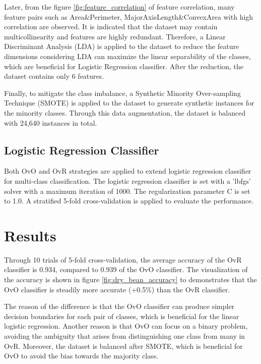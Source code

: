 \documentclass[12pt,a4paper]{article}
\begin{document}
Later, from the figure \ref{fig:feature_correlation} of feature correlation, many feature pairs such as Area&Perimeter, MajorAxisLength&ConvexArea with high correlation are observed. It is indicated that the dataset may contain multicollinearity and features are highly redundant. 
Therefore, a Linear Discriminant Analysis (LDA) is applied to the dataset to reduce the feature dimensions considering LDA can maximize the linear separability of the classes, which are beneficial for Logistic Regression classifier. After the reduction, the dataset contains only 6 features.

Finally, to mitigate the class imbalance, a Synthetic Minority Over-sampling Technique (SMOTE) \cite{chawla2002smote} is applied to the dataset to generate synthetic instances for the minority classes. 
Through this data augmentation, the dataset is balanced with 24,640 instances in total.
\subsection{Logistic Regression Classifier}\label{subsec:classifier}
Both OvO \cite{scikit-learn_OneVsRestClassifier} and OvR \cite{scikit-learn_OneVsOneClassifier} strategies are applied to extend logistic regression classifier for multi-class classification. 
The logistic regression classifier is set with a 'lbfgs' solver with a maximum iteration of 1000. The regularization parameter C is set to 1.0. 
A stratified 5-fold cross-validation \cite{scikit-learn_cross_validation} is applied to evaluate the performance.

\section{Results}\label{sec:results}
Through 10 trials of 5-fold cross-validation, the average accuracy of the OvR classifier is 0.934, compared to 0.939 of the OvO classifier. 
The visualization of the accuracy is shown in figure \ref{fig:dry_bean_accuracy} to demonstrates that the OvO classifier is steadily more accurate (+0.5\%) than the OvR classifier.

The reason of the difference is that the OvO classifier can produce simpler decision boundaries for each pair of classes, which is beneficial for the linear logistic regression. 
Another reason is that OvO can focus on a binary problem, avoiding the ambiguity that arises from distinguishing one class from many in OvR. 
Moreover, the dataset is balanced after SMOTE, which is beneficial for OvO to avoid the bias towards the majority class.
\end{document}

